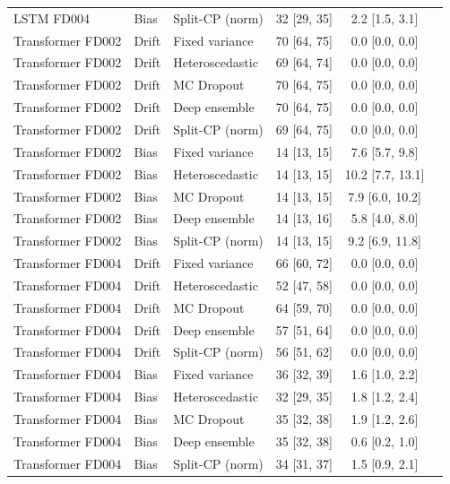 \documentclass[10pt,a4paper]{article}
\begin{document}
\begin{table}[H]
\begin{tabular}{llllcc}
LSTM FD004 & Bias & Split-CP (norm) & 32 [29, 35] & 2.2 [1.5, 3.1] \\
Transformer FD002 & Drift & Fixed variance & 70 [64, 75] & 0.0 [0.0, 0.0] \\
Transformer FD002 & Drift & Heteroscedastic & 69 [64, 74] & 0.0 [0.0, 0.0] \\
Transformer FD002 & Drift & MC Dropout & 70 [64, 75] & 0.0 [0.0, 0.0] \\
Transformer FD002 & Drift & Deep ensemble & 70 [64, 75] & 0.0 [0.0, 0.0] \\
Transformer FD002 & Drift & Split-CP (norm) & 69 [64, 75] & 0.0 [0.0, 0.0] \\
Transformer FD002 & Bias & Fixed variance & 14 [13, 15] & 7.6 [5.7, 9.8] \\
Transformer FD002 & Bias & Heteroscedastic & 14 [13, 15] & 10.2 [7.7, 13.1] \\
Transformer FD002 & Bias & MC Dropout & 14 [13, 15] & 7.9 [6.0, 10.2] \\
Transformer FD002 & Bias & Deep ensemble & 14 [13, 16] & 5.8 [4.0, 8.0] \\
Transformer FD002 & Bias & Split-CP (norm) & 14 [13, 15] & 9.2 [6.9, 11.8] \\
Transformer FD004 & Drift & Fixed variance & 66 [60, 72] & 0.0 [0.0, 0.0] \\
Transformer FD004 & Drift & Heteroscedastic & 52 [47, 58] & 0.0 [0.0, 0.0] \\
Transformer FD004 & Drift & MC Dropout & 64 [59, 70] & 0.0 [0.0, 0.0] \\
Transformer FD004 & Drift & Deep ensemble & 57 [51, 64] & 0.0 [0.0, 0.0] \\
Transformer FD004 & Drift & Split-CP (norm) & 56 [51, 62] & 0.0 [0.0, 0.0] \\
Transformer FD004 & Bias & Fixed variance & 36 [32, 39] & 1.6 [1.0, 2.2] \\
Transformer FD004 & Bias & Heteroscedastic & 32 [29, 35] & 1.8 [1.2, 2.4] \\
Transformer FD004 & Bias & MC Dropout & 35 [32, 38] & 1.9 [1.2, 2.6] \\
Transformer FD004 & Bias & Deep ensemble & 35 [32, 38] & 0.6 [0.2, 1.0] \\
Transformer FD004 & Bias & Split-CP (norm) & 34 [31, 37] & 1.5 [0.9, 2.1] \\
\bottomrule\end{tabular}
\end{table}
\end{document}
